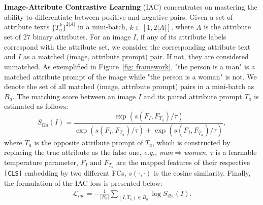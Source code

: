 \documentclass[sigconf]{acmart}
\begin{document}
\noindent\textbf{Image-Attribute Contrastive Learning} 
(IAC) concentrates on mastering the ability to differentiate between positive and negative pairs. 
Given a set of attribute texts $\{T_a^k\}^{2|A|}$ in a mini-batch, $k \in [1, 2|A|]$, where $A$ is the attribute set of $27$ binary attributes.
For an image $I$, if any of its attribute labels correspond with the attribute set, we consider the corresponding attribute text and $I$ as a matched (image, attribute prompt) pair. If not, they are considered unmatched. 
As exemplified in Figure~\ref{fig: framework}, "the person is a man" is a matched attribute prompt of the image while "the person is a woman" is not. We denote the set of all matched (image, attribute prompt) pairs in a mini-batch as $B_a$.
The matching score between an image $I$ and its paired attribute prompt $T_a$ is estimated as follows:
\vspace{-.1in}
\begin{equation}
\label{itoa}
S_{\text{i2a}}(I) = \frac{\exp(s(F_I, F_{T_a})/\tau)}{\exp(s(F_I, F_{T_a})/\tau) + \exp(s(F_I, F_{\bar{T}_a})/\tau)},
\end{equation}
where ${\bar{T}_a}$ is the opposite attribute prompt of ${T_a}$, {which is constructed by replacing the true attribute as the false one, \emph{e.g., man$\Rightarrow$woman}}, $\tau$ is a learnable temperature parameter, $F_I$ and $F_{T_a}$ are the mapped features of their respective \texttt{[CLS]} embedding by two different FCs, $s(\cdot,\cdot)$ is the cosine similarity. Finally,
the formulation of the IAC loss is presented below:
\vspace{-.1in}
\begin{equation}
\begin{split}
\mathcal{L}_{iac} = -\frac{1}{|B_a|}\sum_{(I,T_a) \in B_a}\log S_{\text{i2a}}(I).
\end{split}
\end{equation}
\end{document}
